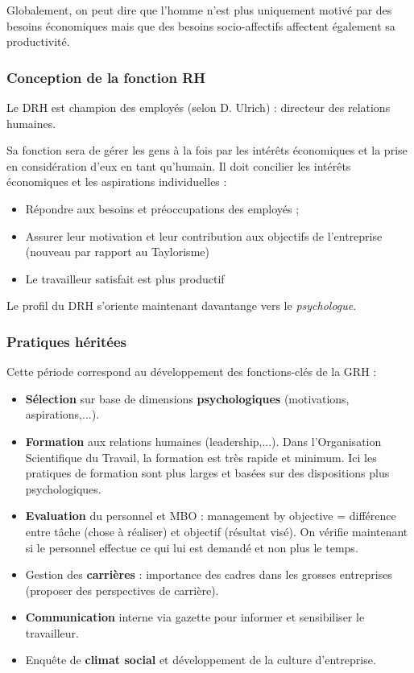 \documentclass[12pt]{article}
\begin{document}
	  Globalement, on peut dire que l'homme n'est plus uniquement motivé par des besoins économiques mais que des besoins socio-affectifs affectent également sa productivité.
	  
	  \subsubsection{Conception de la fonction RH}
	  
	  Le DRH est \og{} champion des employés\fg{} (selon D. Ulrich) : directeur des relations humaines.
	  
	  Sa fonction sera de gérer les gens à la fois par les intérêts économiques et la prise en considération d'eux en tant qu'humain. Il doit concilier les intérêts économiques et les aspirations individuelles :
	  
	  \begin{itemize}
	   \item Répondre aux besoins et préoccupations des employés ;
	   \item Assurer leur motivation et leur contribution aux objectifs de l'entreprise (nouveau par rapport au Taylorisme)
	   \item Le travailleur satisfait est plus productif
	  \end{itemize}
	  
	  Le profil du DRH s'oriente maintenant davantange vers le \emph{psychologue}.
	  
	  \subsubsection{Pratiques héritées}
	  
	  Cette période correspond au développement des fonctions-clés de la GRH :
	  
	  \begin{itemize}
	   \item \textbf{Sélection} sur base de dimensions \textbf{psychologiques} (motivations, aspirations,...).
	   \item \textbf{Formation} aux relations humaines (leadership,...). Dans l'Organisation Scientifique du Travail, la formation est très rapide et minimum. Ici les pratiques de formation sont plus larges et basées sur des dispositions plus psychologiques.
	   \item \textbf{Evaluation} du personnel et MBO : management by objective = différence entre tâche (chose à réaliser) et objectif (résultat visé). On vérifie maintenant si le personnel effectue ce qui lui est demandé et non plus le temps.
	   \item Gestion des \textbf{carrières} : importance des cadres dans les grosses entreprises (proposer des perspectives de carrière).
	   \item \textbf{Communication} interne via gazette pour informer et sensibiliser le travailleur.
	   \item Enquête de \textbf{climat social} et développement de la culture d'entreprise.
	  \end{itemize}
	  
\end{document}
